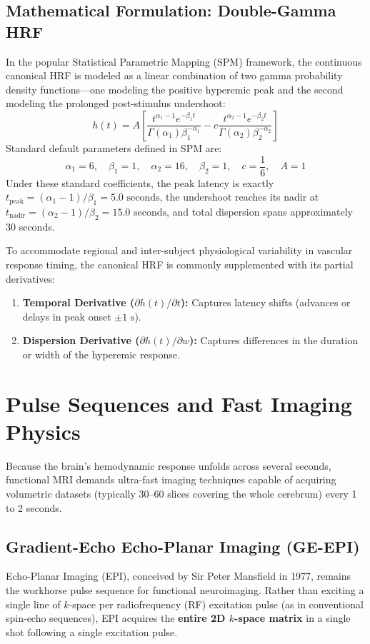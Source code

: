\documentclass[11pt,a4paper]{article}
\begin{document}
\subsection{Mathematical Formulation: Double-Gamma HRF}
In the popular Statistical Parametric Mapping (SPM) framework, the continuous canonical HRF is modeled as a linear combination of two gamma probability density functions—one modeling the positive hyperemic peak and the second modeling the prolonged post-stimulus undershoot:
\begin{equation}
    h(t) = A \left[ \frac{t^{\alpha_1 - 1} e^{-\beta_1 t}}{\Gamma(\alpha_1) \beta_1^{-\alpha_1}} - c \frac{t^{\alpha_2 - 1} e^{-\beta_2 t}}{\Gamma(\alpha_2) \beta_2^{-\alpha_2}} \right]
\end{equation}
Standard default parameters defined in SPM are:
\begin{equation}
    \alpha_1 = 6, \quad \beta_1 = 1, \quad \alpha_2 = 16, \quad \beta_2 = 1, \quad c = \frac{1}{6}, \quad A = 1
\end{equation}
Under these standard coefficients, the peak latency is exactly $t_{\text{peak}} = (\alpha_1 - 1)/\beta_1 = 5.0\text{ seconds}$, the undershoot reaches its nadir at $t_{\text{nadir}} = (\alpha_2 - 1)/\beta_2 = 15.0\text{ seconds}$, and total dispersion spans approximately 30 seconds.

To accommodate regional and inter-subject physiological variability in vascular response timing, the canonical HRF is commonly supplemented with its partial derivatives:
\begin{enumerate}
    \item \textbf{Temporal Derivative ($\partial h(t)/\partial t$):} Captures latency shifts (advances or delays in peak onset $\pm 1\text{ s}$).
    \item \textbf{Dispersion Derivative ($\partial h(t)/\partial w$):} Captures differences in the duration or width of the hyperemic response.
\end{enumerate}

\section{Pulse Sequences and Fast Imaging Physics}
Because the brain's hemodynamic response unfolds across several seconds, functional MRI demands ultra-fast imaging techniques capable of acquiring volumetric datasets (typically 30--60 slices covering the whole cerebrum) every 1 to 2 seconds.

\subsection{Gradient-Echo Echo-Planar Imaging (GE-EPI)}
Echo-Planar Imaging (EPI), conceived by Sir Peter Mansfield in 1977, remains the workhorse pulse sequence for functional neuroimaging. Rather than exciting a single line of $k$-space per radiofrequency (RF) excitation pulse (as in conventional spin-echo sequences), EPI acquires the \textbf{entire 2D $k$-space matrix} in a single shot following a single excitation pulse.
\end{document}
